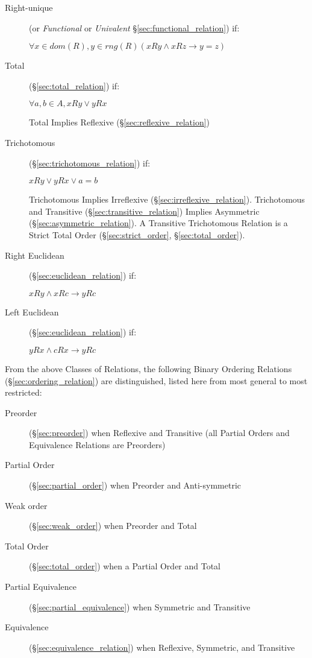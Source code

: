 \begin{description}
\item[Right-unique] (or \emph{Functional} or \emph{Univalent}
  \S\ref{sec:functional_relation}) if:

  $ \forall x \in dom(R), y \in rng(R)
    (xRy \wedge xRz \to y = z) $

\item[Total] (\S\ref{sec:total_relation}) if:

  $ \forall a,b \in A, xRy \vee yRx $

  Total Implies Reflexive (\S\ref{sec:reflexive_relation})

\item[Trichotomous] (\S\ref{sec:trichotomous_relation}) if:

  $ xRy \vee yRx \vee a = b $

  Trichotomous Implies Irreflexive (\S\ref{sec:irreflexive_relation}).
  Trichotomous and Transitive (\S\ref{sec:transitive_relation})
  Implies Asymmetric (\S\ref{sec:asymmetric_relation}). A Transitive
  Trichotomous Relation is a Strict Total Order
  (\S\ref{sec:strict_order}, \S\ref{sec:total_order}).

\item[Right Euclidean] (\S\ref{sec:euclidean_relation}) if:

  $ xRy \wedge xRc \to yRc $

\item[Left Euclidean] (\S\ref{sec:euclidean_relation}) if:

  $ yRx \wedge cRx \to yRc $

\end{description}

From the above Classes of Relations, the following Binary Ordering
Relations (\S\ref{sec:ordering_relation}) are distinguished, listed
here from most general to most restricted:

\begin{description}
\item[Preorder] (\S\ref{sec:preorder}) when Reflexive and Transitive
  (all Partial Orders and Equivalence Relations are Preorders)
\item[Partial Order] (\S\ref{sec:partial_order}) when Preorder and
  Anti-symmetric
\item[Weak order] (\S\ref{sec:weak_order}) when Preorder and Total
\item[Total Order] (\S\ref{sec:total_order}) when a Partial Order and
  Total
\item[Partial Equivalence] (\S\ref{sec:partial_equivalence}) when
  Symmetric and Transitive
\item[Equivalence] (\S\ref{sec:equivalence_relation}) when Reflexive,
  Symmetric, and Transitive
\end{description}

